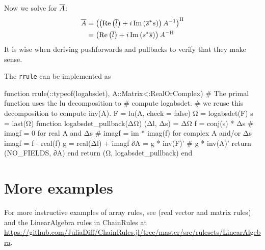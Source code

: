 \documentclass[../../main.tex]{subfiles}
\begin{document}
\begin{refsection}
Now we solve for $\overline{A}$:
\begin{align*}
	\overline{A} & = {\left( \left(
		\Re \left( \overline{l} \right) +
		i \Im \left( { \overline{s} }^* s \right)
	\right) A^{-1} \right)}^\mathrm{H}           \\
	         & = \left(
	\Re \left( \overline{l} \right) +
	i \Im \left( { s }^* \overline{s} \right)
	\right) {A}^{-\mathrm{H}}
\end{align*}
It is wise when deriving pushforwards and pullbacks to verify that they make sense.\footnotemark


The \texttt{rrule} can be implemented as
\begin{juliacode}
function rrule(::typeof(logabsdet), A::Matrix{<:RealOrComplex})
    # The primal function uses the lu decomposition to
    # compute logabsdet.
    # we reuse this decomposition to compute inv(A).
    F = lu(A, check = false)
    Ω = logabsdet(F)
    s = last(Ω)
    function logabsdet_pullback(ΔΩ)
        (Δl, Δs) = ΔΩ
        f = conj(s) * Δs
        # imagf = 0 for real A and Δs
        # imagf = im * imag(f) for complex A and/or Δs
        imagf = f - real(f)
        g = real(Δl) + imagf
        ∂A = g * inv(F)' # g * inv(A)'
        return (NO_FIELDS, ∂A)
    end
    return (Ω, logabsdet_pullback)
end
\end{juliacode}

\clearpage %
\section{More examples}\label{more-examples}

For more instructive examples of array rules, see \cite{gilesExtendedCollectionMatrix2008} (real vector and matrix rules) and the LinearAlgebra rules in ChainRules at \url{https://github.com/JuliaDiff/ChainRules.jl/tree/master/src/rulesets/LinearAlgebra}.

\clearpage
\printbibliography[heading=subbibintoc]
\end{refsection}
\end{document}
